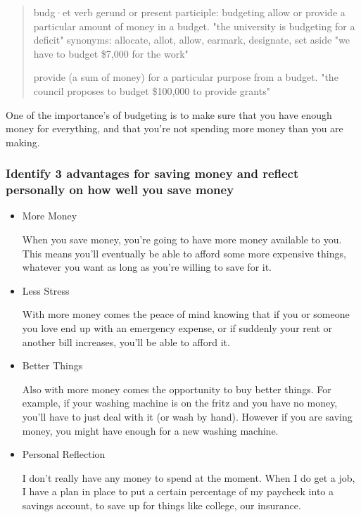 \documentclass[11pt]{article}
\begin{document}
\begin{quote}
budg·et
verb
gerund or present participle: budgeting
allow or provide a particular amount of money in a budget.
"the university is budgeting for a deficit"
synonyms:	allocate, allot, allow, earmark, designate, set aside
"we have to budget \$7,000 for the work"

provide (a sum of money) for a particular purpose from a budget.
"the council proposes to budget \$100,000 to provide grants"
\end{quote}

One of the importance's of budgeting is to make sure that you have enough money for everything, and that you're not spending more money than you are making.

\subsubsection*{Identify 3 advantages for saving money and reflect personally on how well you save money}
\label{sec:orgf153b57}
\begin{itemize}
\item More Money
\label{sec:orgf38ef78}

When you save money, you're going to have more money available to you. This means you'll eventually be able to afford some more expensive things, whatever you want as long as you're willing to save for it.

\item Less Stress
\label{sec:org2348a0c}

With more money comes the peace of mind knowing that if you or someone you love end up with an emergency expense, or if suddenly your rent or another bill increases, you'll be able to afford it.

\item Better Things
\label{sec:org3d71b74}

Also with more money comes the opportunity to buy better things. For example, if your washing machine is on the fritz and you have no money, you'll have to just deal with it (or wash by hand). However if you are saving money, you might have enough for a new washing machine.

\item Personal Reflection
\label{sec:org431c3c3}

I don't really have any money to spend at the moment. When I do get a job, I have a plan in place to put a certain percentage of my paycheck into a savings account, to save up for things like college, our insurance.
\end{itemize}
\end{document}

